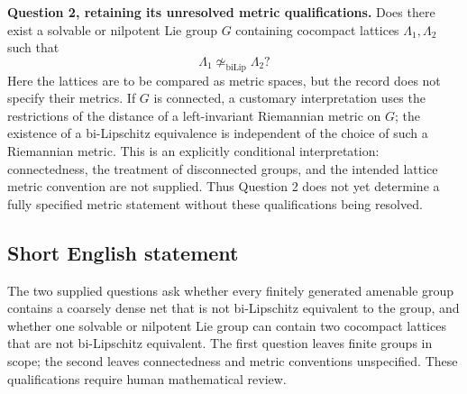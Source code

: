 \documentclass[11pt]{article}
\begin{document}
\textbf{Question 2, retaining its unresolved metric qualifications.} Does there exist a solvable or nilpotent Lie group \(G\) containing cocompact lattices \(\Lambda_1,\Lambda_2\) such that
\[
\Lambda_1\not\simeq_{\mathrm{biLip}}\Lambda_2?
\]
Here the lattices are to be compared as metric spaces, but the record does not specify their metrics. If \(G\) is connected, a customary interpretation uses the restrictions of the distance of a left-invariant Riemannian metric on \(G\); the existence of a bi-Lipschitz equivalence is independent of the choice of such a Riemannian metric. This is an explicitly conditional interpretation: connectedness, the treatment of disconnected groups, and the intended lattice metric convention are not supplied. Thus Question 2 does not yet determine a fully specified metric statement without these qualifications being resolved.
\subsection{Short English statement}
The two supplied questions ask whether every finitely generated amenable group contains a coarsely dense net that is not bi-Lipschitz equivalent to the group, and whether one solvable or nilpotent Lie group can contain two cocompact lattices that are not bi-Lipschitz equivalent. The first question leaves finite groups in scope; the second leaves connectedness and metric conventions unspecified. These qualifications require human mathematical review.
\end{document}
